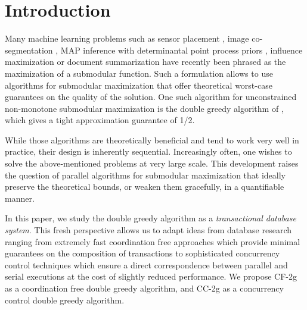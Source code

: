 \documentclass{article} %
\newcommand{\hogwild}{CF-2g}
\newcommand{\occ}{CC-2g}
\begin{document}
\begin{abstract}

\end{abstract}

\section{Introduction}



Many machine learning problems such as sensor placement \cite{krauseGuestrin11}, image co-segmentation \cite{kim11}, MAP inference with determinantal point process priors \cite{gillenwater12}, influence maximization \cite{kkt03} or document summarization \cite{lin11} have recently been phrased as the maximization of a submodular function.
Such a formulation allows to use algorithms for submodular maximization \cite{buchbinder2012,nemhauser1978} that offer theoretical worst-case guarantees on the quality of the solution.
One such algorithm for unconstrained non-monotone submodular maximization is the double greedy algorithm of \cite{buchbinder2012}, which gives a tight approximation guarantee of 1/2.

While those algorithms are theoretically beneficial and tend to work very well in practice, their design is inherently sequential. Increasingly often, one wishes to solve the above-mentioned problems at very large scale. This development raises the question of parallel algorithms for submodular maximization that ideally preserve the theoretical bounds, or weaken them gracefully, in a quantifiable manner. 

In this paper, we study the double greedy algorithm as a \emph{transactional database system}.
This fresh perspective allows us to adapt ideas from database research ranging from extremely fast coordination free approaches which provide minimal guarantees on the composition of transactions to sophisticated concurrency control techniques which ensure a direct correspondence between parallel and serial executions at the cost of slightly reduced performance.
We propose \hogwild{} as a coordination free double greedy algorithm, and \occ{} as a concurrency control double greedy algorithm.
\end{document}
